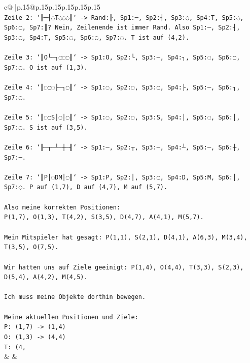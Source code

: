 \documentclass{article}
\begin{document}
{\begin{supertabular}{c@{$\;$}|p{.15\linewidth}@{}p{.15\linewidth}p{.15\linewidth}p{.15\linewidth}p{.15\linewidth}p{.15\linewidth}}
{{{\\ 
\texttt{Zeile 2: `╟─┤◌T◌◌◌║` {-}> Rand:╟, Sp1:─, Sp2:┤, Sp3:◌, Sp4:T, Sp5:◌, Sp6:◌, Sp7:║? Nein, Zeilenende ist immer Rand. Also Sp1:─, Sp2:┤, Sp3:◌, Sp4:T, Sp5:◌, Sp6:◌, Sp7:◌. T ist auf (4,2).} \\
\\ 
\texttt{Zeile 3: `║O└─┐◌◌◌║` {-}> Sp1:O, Sp2:└, Sp3:─, Sp4:┐, Sp5:◌, Sp6:◌, Sp7:◌. O ist auf (1,3).} \\
\\ 
\texttt{Zeile 4: `║◌◌◌├─┐◌║` {-}> Sp1:◌, Sp2:◌, Sp3:◌, Sp4:├, Sp5:─, Sp6:┐, Sp7:◌.} \\
\\ 
\texttt{Zeile 5: `║◌◌S│◌│◌║` {-}> Sp1:◌, Sp2:◌, Sp3:S, Sp4:│, Sp5:◌, Sp6:│, Sp7:◌. S ist auf (3,5).} \\
\\ 
\texttt{Zeile 6: `╟─┬─┴─┼─╢` {-}> Sp1:─, Sp2:┬, Sp3:─, Sp4:┴, Sp5:─, Sp6:┼, Sp7:─.} \\
\\ 
\texttt{Zeile 7: `║P│◌DM│◌║` {-}> Sp1:P, Sp2:│, Sp3:◌, Sp4:D, Sp5:M, Sp6:│, Sp7:◌. P auf (1,7), D auf (4,7), M auf (5,7).} \\
\\ 
\texttt{Also meine korrekten Positionen: } \\
\texttt{P(1,7), O(1,3), T(4,2), S(3,5), D(4,7), A(4,1), M(5,7).} \\
\\ 
\texttt{Mein Mitspieler hat gesagt: P(1,1), S(2,1), D(4,1), A(6,3), M(3,4), T(3,5), O(7,5).} \\
\\ 
\texttt{Wir hatten uns auf Ziele geeinigt: P(1,4), O(4,4), T(3,3), S(2,3), D(5,4), A(4,2), M(4,5).} \\
\\ 
\texttt{Ich muss meine Objekte dorthin bewegen.} \\
\\ 
\texttt{Meine aktuellen Positionen und Ziele:} \\
\texttt{P: (1,7) {-}> (1,4)} \\
\texttt{O: (1,3) {-}> (4,4)} \\
\texttt{T: (4,} \\
            }
        }
    }
    & & \\ \\


\end{supertabular}}
\end{document}
